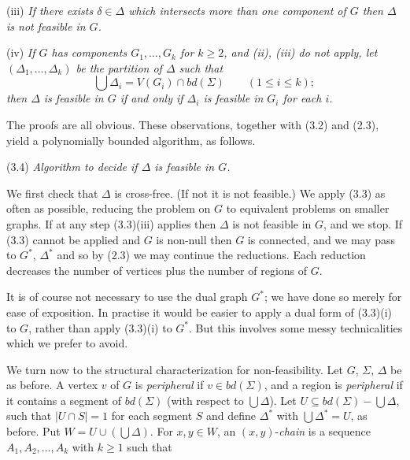\hspace*{12pt}(iii) \textit{If there exists $\delta \in \Delta$ which intersects more than one component of $G$ then $\Delta$ is not feasible in $G$.}

\hspace*{12pt}(iv) \textit{If $G$ has components $G_1, \dots, G_k$ for $k \ge 2$, and (ii), (iii) do not apply, let $(\Delta_1, \dots, \Delta_k)$ be the partition of $\Delta$ such that}
\begin{equation*}
\bigcup \Delta_i = V(G_i) \cap bd(\Sigma) \qquad (1 \le i \le k);
\end{equation*}
\textit{then $\Delta$ is feasible in $G$ if and only if $\Delta_i$ is feasible in $G_i$ for each $i$.}

The proofs are all obvious. These observations, together with (3.2) and (2.3), yield a polynomially bounded algorithm, as follows.

\stmt
(3.4) \textit{Algorithm to decide if $\Delta$ is feasible in $G$.}

We first check that $\Delta$ is cross-free. (If not it is not feasible.) We apply (3.3) as often as possible, reducing the problem on $G$ to equivalent problems on smaller graphs. If at any step (3.3)(iii) applies then $\Delta$ is not feasible in $G$, and we stop. If (3.3) cannot be applied and $G$ is non-null then $G$ is connected, and we may pass to $G^*$, $\Delta^*$ and so by (2.3) we may continue the reductions. Each reduction decreases the number of vertices plus the number of regions of $G$.

It is of course not necessary to use the dual graph $G^*$; we have done so merely for ease of exposition. In practise it would be easier to apply a dual form of (3.3)(i) to $G$, rather than apply (3.3)(i) to $G^*$. But this involves some messy technicalities which we prefer to avoid.

We turn now to the structural characterization for non-feasibility. Let $G$, $\Sigma$, $\Delta$ be as before. A vertex $v$ of $G$ is \textit{peripheral} if $v \in bd(\Sigma)$, and a region is \textit{peripheral} if it contains a segment of $bd(\Sigma)$ (with respect to $\bigcup \Delta$). Let $U \subseteq bd(\Sigma) - \bigcup \Delta$, such that $|U \cap S| = 1$ for each segment $S$ and define $\Delta^*$ with $\bigcup \Delta^* = U$, as before. Put $W = U \cup (\bigcup \Delta)$. For $x, y \in W$, an $(x, y)$-\textit{chain} is a sequence $A_1, A_2, \dots, A_k$ with $k \ge 1$ such that


